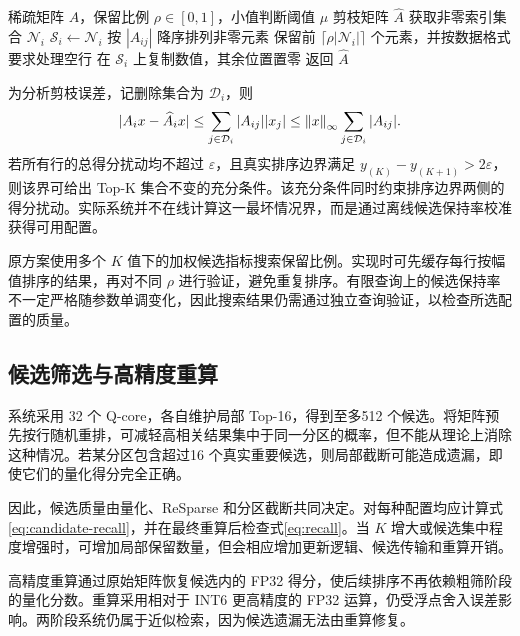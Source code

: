 \begin{algorithm}[htbp]
\caption{用于低比特预筛的按行 ReSparse}
\label{alg:resparse}
\begin{algorithmic}[1]
\REQUIRE 稀疏矩阵 $A$，保留比例 $\rho\in[0,1]$，小值判断阈值 $\mu$
\ENSURE 剪枝矩阵 $\widehat A$
\STATE 获取非零索引集合 $\mathcal{N}_i$
\STATE $\mathcal{S}_i\leftarrow\mathcal{N}_i$
\ELSE
\STATE 按 $|A_{ij}|$ 降序排列非零元素
\STATE 保留前 $\lceil\rho|\mathcal{N}_i|\rceil$ 个元素，并按数据格式要求处理空行
\ENDIF
\STATE 在 $\mathcal{S}_i$ 上复制数值，其余位置置零
\ENDFOR
\STATE 返回 $\widehat A$
\end{algorithmic}
\end{algorithm}

为分析剪枝误差，记删除集合为 $\mathcal{D}_i$，则
\begin{equation}
 |A_ix-\widehat A_ix|\leq\sum_{j\in\mathcal{D}_i}|A_{ij}||x_j|
 \leq\left\lVert x\right\rVert_{\infty}\sum_{j\in\mathcal{D}_i}|A_{ij}|.
 \label{eq:prune-error}
\end{equation}
若所有行的总得分扰动均不超过 $\varepsilon$，且真实排序边界满足 $y_{(K)}-y_{(K+1)}>2\varepsilon$，则该界可给出 Top-K 集合不变的充分条件。该充分条件同时约束排序边界两侧的得分扰动。实际系统并不在线计算这一最坏情况界，而是通过离线候选保持率校准获得可用配置。

原方案使用多个 $K$ 值下的加权候选指标搜索保留比例。实现时可先缓存每行按幅值排序的结果，再对不同 $\rho$ 进行验证，避免重复排序。有限查询上的候选保持率不一定严格随参数单调变化，因此搜索结果仍需通过独立查询验证，以检查所选配置的质量。

\subsection{候选筛选与高精度重算}
系统采用 32 个 Q-core，各自维护局部 Top-16，得到至多512 个候选。将矩阵预先按行随机重排，可减轻高相关结果集中于同一分区的概率，但不能从理论上消除这种情况。若某分区包含超过16 个真实重要候选，则局部截断可能造成遗漏，即使它们的量化得分完全正确。

因此，候选质量由量化、ReSparse 和分区截断共同决定。对每种配置均应计算式\eqref{eq:candidate-recall}，并在最终重算后检查式\eqref{eq:recall}。当 $K$ 增大或候选集中程度增强时，可增加局部保留数量，但会相应增加更新逻辑、候选传输和重算开销。

高精度重算通过原始矩阵恢复候选内的 FP32 得分，使后续排序不再依赖粗筛阶段的量化分数。重算采用相对于 INT6 更高精度的 FP32 运算，仍受浮点舍入误差影响。两阶段系统仍属于近似检索，因为候选遗漏无法由重算修复。

